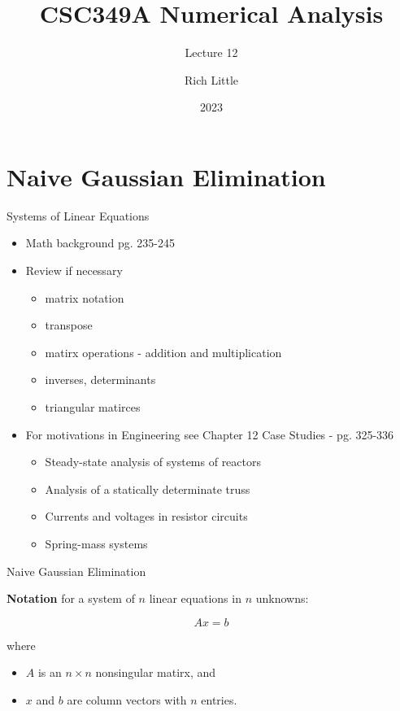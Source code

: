 \documentclass[12pt]{beamer}
\title[CSC349A Numerical Analysis]{CSC349A Numerical Analysis}
\subtitle[Lecture 12]{Lecture 12}
\date[2023]{2023}
\author[R. Little]{Rich Little}
\institute[University of Victoria]{University of Victoria}
\begin{document}
\frame{\maketitle} %



\section{Naive Gaussian Elimination}

\begin{frame}{Systems of Linear Equations}
\begin{itemize}
\item{Math background pg. 235-245}
\item{Review if necessary}
\begin{itemize}
\item{matrix notation}
\item{transpose}
\item{matirx operations - addition and multiplication}
\item{inverses, determinants}
\item{triangular matirces}
\end{itemize}
\item{For motivations in Engineering see Chapter 12 Case Studies - pg. 325-336}
\begin{itemize}
\item{Steady-state analysis of systems of reactors}
\item{Analysis of a statically determinate truss}
\item{Currents and voltages in resistor circuits}
\item{Spring-mass systems}
\end{itemize}
\end{itemize}
\end{frame}



\begin{frame}{Naive Gaussian Elimination}

{\bf Notation} for a system of $n$ linear equations in $n$ unknowns:

\[
Ax=b
\]

\noindent
where

\begin{itemize}
\item{$A$ is an $n \times n$ nonsingular matirx, and}
\item{$x$ and $b$ are column vectors with $n$ entries.}
\end{itemize}

\end{frame}
\end{document}
